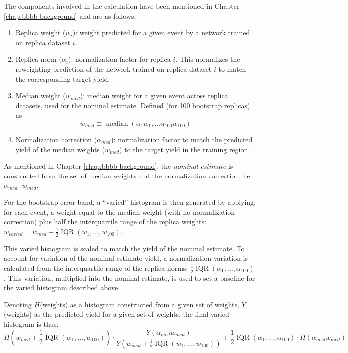 The components involved in the calculation have been mentioned in Chapter \ref{chap:bbbb-background} and 
are as follows:
\begin{enumerate}
\item Replica weight ($w_{i}$): weight predicted for a given event by a network trained on replica 
dataset $i$.
\item Replica norm ($\alpha_{i}$): normalization factor for replica $i$. This normalizes the reweighting 
prediction of the network trained on replica dataset $i$ to match the corresponding target yield.
\item Median weight ($w_{med}$): median weight for a given event across replica datasets, used for the nominal estimate. Defined (for 100 bootstrap replicas) as
\begin{equation}
w_{med} \equiv \operatorname{median}(\alpha_{1}w_{1}, \ldots \alpha_{100}w_{100})
\end{equation}
\item Normalization correction ($\alpha_{med}$): normalization factor to match the predicted yield of the median weights
($w_{med}$) to the target yield in the training region.
\end{enumerate}

As mentioned in Chapter \ref{chap:bbbb-background}, the \emph{nominal estimate} is constructed from the set of
median weights and the normalization correction, i.e. $\alpha_{med}\cdot w_{med}$.

For the bootstrap error band, a ``varied'' histogram is then generated by applying, for each event, a weight
equal to the median weight (with no normalization correction) plus half the interquartile range of 
the replica weights: $w_{varied} = w_{med} + \frac{1}{2}\operatorname{IQR}(w_{1},\ldots, w_{100})$.

This varied histogram is scaled to match the yield of the nominal estimate. To account for variation of the 
nominal estimate yield, a normalization variation is calculated from the interquartile range of the replica norms:
$\frac{1}{2}\operatorname{IQR}(\alpha_{1}, \ldots, \alpha_{100})$. This variation, multiplied into the nominal
estimate, is used to set a baseline for the varied histogram described above.

Denoting $H$(weights) as a histogram constructed from a given set of weights, $Y$(weights) as the predicted yield
for a given set of weights, the final varied histogram is thus:
\begin{equation}
H(w_{med} +\frac{1}{2}\operatorname{IQR}(w_{1},\ldots, w_{100}))\cdot \frac{Y(\alpha_{med}w_{med})}{Y(w_{med} +\frac{1}{2}\operatorname{IQR}(w_{1},\ldots, w_{100}))} + \frac{1}{2}\operatorname{IQR}(\alpha_{1}, \ldots, \alpha_{100})\cdot H(\alpha_{med}w_{med})
\end{equation}

